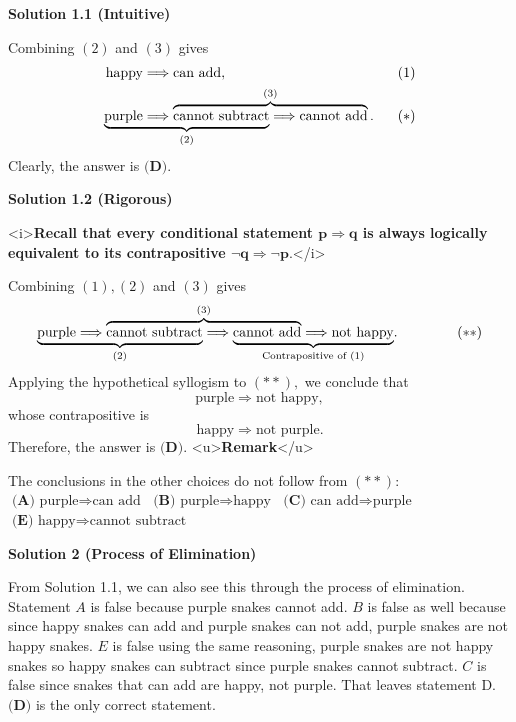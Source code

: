 \begin{enumerate}
 



\textbf{Solution 1.1 (Intuitive)}

Combining $(2)$ and $(3)$ gives
 \begin{align*} \text{happy}&\Longrightarrow\text{can add}, &(1) \\ \lefteqn{\underbrace{\phantom{\text{purple}\Longrightarrow\text{cannot subtract}}}_{(2)}}\text{purple}&\Longrightarrow\overbrace{\text{cannot subtract}\Longrightarrow\text{cannot add}}^{(3)}. \hspace{2.5mm} &(*) \end{align*}
Clearly, the answer is $\boxed{\textbf{(D)}}.$




\textbf{Solution 1.2 (Rigorous)}

<i>\textbf{Recall that every conditional statement $\boldsymbol{p\Longrightarrow q}$ is always logically equivalent to its contrapositive $\boldsymbol{\lnot q\Longrightarrow\lnot p.}$}</i>

 Combining $(1),(2)$ and $(3)$ gives 
 \[\lefteqn{\underbrace{\phantom{\text{purple}\Longrightarrow\text{cannot subtract}}}_{(2)}}\text{purple}\Longrightarrow\overbrace{\text{cannot subtract}\Longrightarrow\lefteqn{\underbrace{\phantom{\text{cannot add}\Longrightarrow\text{not happy}}}_{\text{Contrapositive of }(1)}}\text{cannot add}}^{(3)}\Longrightarrow\text{not happy}. \hspace{15mm}(**)\] Applying the hypothetical syllogism to $(**),$ we conclude that 
 \[\text{purple}\Longrightarrow\text{not happy},\] whose contrapositive is 
 \[\text{happy}\Longrightarrow\text{not purple}.\] Therefore, the answer is $\boxed{\textbf{(D)}}.$
<u>\textbf{Remark}</u>

 The conclusions in the other choices do not follow from $(**):$
$\textbf{(A) }\text{purple}\Longrightarrow\text{can add}$
$\textbf{(B) }\text{purple}\Longrightarrow\text{happy}$
$\textbf{(C) }\text{can add}\Longrightarrow\text{purple}$
$\textbf{(E) }\text{happy}\Longrightarrow\text{cannot subtract}$




\textbf{Solution 2 (Process of Elimination)}

From Solution 1.1, we can also see this through the process of elimination. Statement $A$ is false because purple snakes cannot add. $B$ is false as well  because since happy snakes can add and purple snakes can not add, purple snakes are not happy snakes. $E$ is false using the same reasoning, purple snakes are not happy snakes so happy snakes can subtract since purple snakes cannot subtract. $C$ is false since snakes that can add are happy, not purple. That leaves statement D. $\boxed{\textbf{(D)}}$ is the only correct statement.


\end{enumerate}
